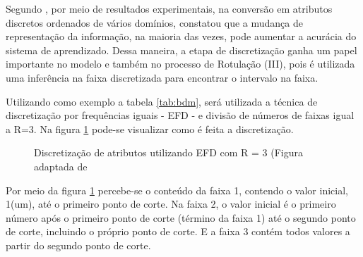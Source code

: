 Segundo \cite{Catlett2006b,Hwang2002}, por meio de resultados experimentais, na conversão em atributos discretos ordenados de vários domínios, constatou que a mudança de representação da informação, na maioria das vezes, pode aumentar a acurácia do sistema de aprendizado. Dessa maneira, a etapa de discretização ganha um papel importante no modelo e também no processo de Rotulação (III), pois é utilizada uma inferência na faixa discretizada para encontrar o intervalo na faixa. 

Utilizando como exemplo a tabela \ref{tab:bdm}, será utilizada a técnica de discretização por frequências iguais - EFD - e divisão de números de faixas igual a R=3. Na figura \ref{fig:EFD_R_3} pode-se visualizar como é feita a discretização. 

 \begin{figure}[!h]
    \centering
    
    
    
    \caption{Discretização de atributos utilizando EFD com R = 3 (Figura adaptada de \cite{Lopes2016}} \label{fig:EFD_R_3}
        
\end{figure}


Por meio da figura \ref{fig:EFD_R_3} percebe-se o conteúdo da faixa 1, contendo o valor inicial, 1(um), até o primeiro ponto de corte. Na faixa 2, o valor inicial é o primeiro número após o primeiro ponto de corte (término da faixa 1) até o segundo ponto de corte, incluindo o próprio ponto de corte. E a faixa 3 contém todos valores a partir do segundo ponto de corte. 

